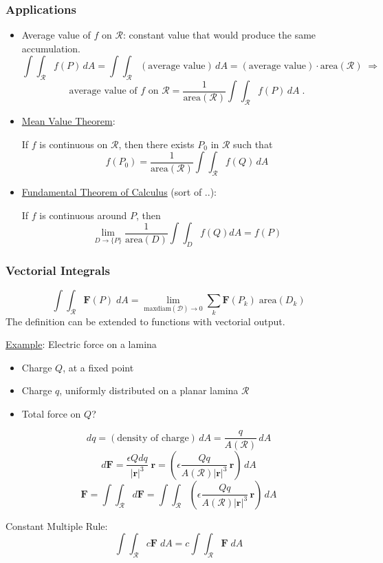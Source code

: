 \begin{frame}
  \frametitle{Applications}

  \begin{itemize}
    \item \pause Average value of $f$ on $\mathcal{R}$: \pause constant value that would produce the same accumulation.\pause
%
$$\int\!\!\!\int_{\mathcal{R}} f(P) \, dA =
\int\!\!\!\int_{\mathcal{R}} (\text{average value}) \, dA =  (\text{average value})
\cdot \text{area}(\mathcal{R}) \; \Longrightarrow $$
%
$$\text{average value of }f \text{ on } \mathcal{R} = \frac{1}{\text{area}(\mathcal{R})} \int\!\!\!\int_{\mathcal{R}} f(P) \, dA\; .$$
%
\item \pause \underline{Mean Value Theorem}:

If $f$ is continuous on $\mathcal{R}$, then there exists $P_0$ in $\mathcal{R}$ such that
%
$$f(P_0) = \frac{1}{\text{area}(\mathcal{R})} \int\!\!\!\int_{\mathcal R} f(Q) \,dA$$

\item \pause \underline{Fundamental Theorem of Calculus} (sort of ..):

If $f$ is continuous around $P$, then
%
$$\lim_{D \to \{ P \} } \frac{1}{\text{area}(D)} \int\!\!\!\int_D f(Q) dA = f(P)$$

  \end{itemize}
\end{frame}


\begin{frame}
  \frametitle{Vectorial Integrals}

    $$\int\!\!\int_{\mathcal{R}} \textbf{F}(P) \; dA = \lim_{\text{maxdiam}(\mathcal{D}) \to 0} \sum_k \textbf{F}(P_k) \; \text{area}(D_k)$$
%
    The definition can be extended to functions with vectorial output.

\underline{Example}: Electric force on a lamina

    \begin{itemize}
      \item Charge $Q$, at a fixed point
      \item Charge $q$, uniformly distributed on a planar lamina $\mathcal{R}$
      \item Total force on $Q$?
    \end{itemize}
    $$dq = (\text{density of charge}) \, dA = \frac{q}{A(\mathcal{R})}\, dA$$
    $$d\textbf{F} = \frac{\epsilon Q dq}{|\textbf{r}|^3} \; \textbf{r}  =
    \left( \epsilon \frac{Q q}{A(\mathcal{R}) |\textbf{r}|^3} \, \textbf{r}\right)\, dA$$
    $$\textbf{F} = \int\!\!\!\int_{\mathcal{R}} d\textbf{F} =
    \int\!\!\!\int_{\mathcal{R}} \left( \epsilon \frac{Q q}{A(\mathcal{R}) |\textbf{r}|^3} \, \textbf{r}\right)\, dA$$

    \pause Constant Multiple Rule:
    $$\int\!\!\int_{\mathcal{R}} c \textbf{F} \; dA =
    c \int\!\!\int_{\mathcal{R}} \textbf{F} \; dA$$
\end{frame}

